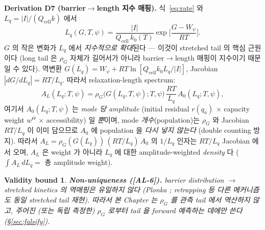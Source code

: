 \documentclass[11pt,a4paper]{article}
\newtheorem*{boundbox}{Validity bound}
\newcommand{\cell}{\mathrm{cell}}
\newcommand{\AL}[1]{\textsf{[AL-#1]}}
\begin{document}
\textbf{Derivation D7 (barrier$\to$length 지수 매핑).} 식~\eqref{eq:rate} 와 $L_q=|I|/(Q_\cell k)$
에서
\begin{equation}
\boxed{\;L_q(G,T,\psi)=\frac{|I|}{Q_\cell\,k_0(T)}\exp\!\Big[\frac{G-W_\psi}{RT}\Big].\;}
\label{eq:L_of_G}
\end{equation}
$G$ 의 작은 변화가 $L_q$ 에서 \emph{지수적으로 확대}된다 — 이것이 stretched tail 의 핵심
근원이다 (long tail 은 $\rho_G$ 자체가 길어서가 아니라 barrier$\to$length 매핑이 지수이기
때문일 수 있다). 역변환 $G(L_q)=W_\psi+RT\ln[Q_\cell k_0 L_q/|I|]$, Jacobian $|dG/dL_q|=RT/L_q$.
따라서 relaxation-length spectrum:
\begin{equation}
A_L(L_q;T,\psi)=\rho_G\big(G(L_q,T,\psi);T,\psi\big)\,\frac{RT}{L_q}\,A_0(L_q;T,\psi),
\label{eq:spectrum}
\end{equation}
여기서 $A_0(L_q;T,\psi)$ 는 \emph{mode 당 amplitude} (initial residual $r(q_a)$ × capacity
weight $w^\Theta$ × accessibility) 일 \emph{뿐}이며, mode \emph{개수}(population)는 $\rho_G$
와 Jacobian $RT/L_q$ 이 이미 담으므로 $A_0$ 에 population 을 \emph{다시 넣지 않는다} (double
counting 방지). 따라서 $A_L=\rho_G(G(L_q))\,(RT/L_q)\,A_0$ 의 $1/L_q$ 인자는 $RT/L_q$ Jacobian
에서 오며, $A_L$ 은 weight 가 아니라 $L_q$ 에 대한 amplitude-weighted \emph{density} 다
($\int A_L\,dL_q=$ 총 amplitude weight).
\begin{boundbox}
\textbf{Non-uniqueness (\AL{6}).} barrier distribution $\to$ stretched kinetics 의 역매핑은
\emph{유일하지 않다} (Plonka \cite{plonka2001}; retrapping 등 다른 메커니즘도 동일 stretched
tail 재현). 따라서 본 Chapter 는 $\rho_G$ 를 관측 tail 에서 \emph{역산하지 않고},
주어진 (또는 독립 측정한) $\rho_G$ 로부터 tail 을 \emph{forward 예측}하는 데에만 쓴다
(\S\ref{sec:falsify}).
\end{boundbox}

\end{document}
